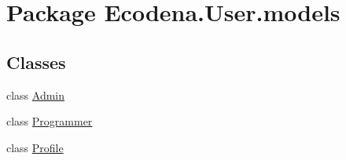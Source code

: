 \hypertarget{namespace_ecodena_1_1_user_1_1models}{
\section{Package Ecodena.User.models}
\label{d5/de0/namespace_ecodena_1_1_user_1_1models}
}
\subsection*{Classes}
\begin{DoxyCompactItemize}
\item 
class \hyperlink{class_ecodena_1_1_user_1_1models_1_1_admin}{Admin}
\item 
class \hyperlink{class_ecodena_1_1_user_1_1models_1_1_programmer}{Programmer}
\item 
class \hyperlink{class_ecodena_1_1_user_1_1models_1_1_profile}{Profile}
\end{DoxyCompactItemize}
